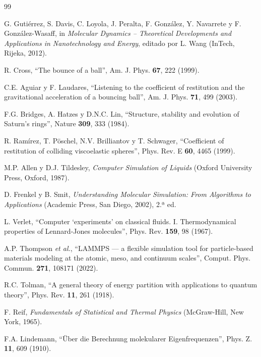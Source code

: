 \documentclass[11pt,a4paper]{article}
\begin{document}
\begin{thebibliography}{99}

G. Gutiérrez, S. Davis, C. Loyola, J. Peralta, F. González, Y. Navarrete
y F. González-Wasaff, in \textit{Molecular Dynamics -- Theoretical
Developments and Applications in Nanotechnology and Energy}, editado por
L. Wang (InTech, Rijeka, 2012).

R. Cross, ``The bounce of a ball'', Am. J. Phys. \textbf{67}, 222 (1999).

C.E. Aguiar y F. Laudares, ``Listening to the coefficient of restitution
and the gravitational acceleration of a bouncing ball'', Am. J. Phys.
\textbf{71}, 499 (2003).

F.G. Bridges, A. Hatzes y D.N.C. Lin, ``Structure, stability and evolution
of Saturn's rings'', Nature \textbf{309}, 333 (1984).

R. Ramírez, T. Pöschel, N.V. Brilliantov y T. Schwager, ``Coefficient of
restitution of colliding viscoelastic spheres'', Phys. Rev. E \textbf{60},
4465 (1999).

M.P. Allen y D.J. Tildesley, \textit{Computer Simulation of Liquids}
(Oxford University Press, Oxford, 1987).

D. Frenkel y B. Smit, \textit{Understanding Molecular Simulation: From
Algorithms to Applications} (Academic Press, San Diego, 2002), 2.ª ed.

L. Verlet, ``Computer `experiments' on classical fluids. I.
Thermodynamical properties of Lennard-Jones molecules'', Phys. Rev.
\textbf{159}, 98 (1967).

A.P. Thompson \emph{et al.}, ``LAMMPS --- a flexible simulation tool for
particle-based materials modeling at the atomic, meso, and continuum
scales'', Comput. Phys. Commun. \textbf{271}, 108171 (2022).

R.C. Tolman, ``A general theory of energy partition with applications to
quantum theory'', Phys. Rev. \textbf{11}, 261 (1918).

F. Reif, \textit{Fundamentals of Statistical and Thermal Physics}
(McGraw-Hill, New York, 1965).

F.A. Lindemann, ``Über die Berechnung molekularer Eigenfrequenzen'',
Phys. Z. \textbf{11}, 609 (1910).


\end{thebibliography}
\end{document}
